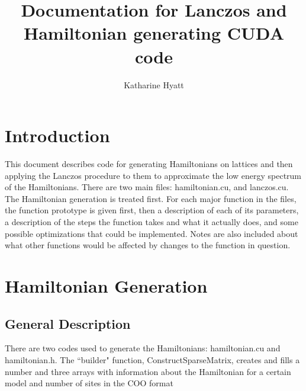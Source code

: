 \documentclass{article}
\author{Katharine Hyatt}
\title{Documentation for Lanczos and Hamiltonian generating CUDA code}
\begin{document}
\renewcommand{\int}{\textcolor{Green}{int $\,$}}
\newcommand{\const}{\textcolor{Green}{const $\,$}}
\renewcommand{\long}{\textcolor{Green}{long $\,$}}
\newcommand{\double}{\textcolor{Green}{double $\,$}}
\newcommand{\typelongptr}{\textcolor{Green}{long$^\ast \,$}}
\newcommand{\void}{\textcolor{Green}{void $\,$}}
\newcommand{\typelongtwoptr}{\textcolor{Green}{long2$^\ast \,$}}
\newcommand{\cuDoubleComplex}{\textcolor{Green}{cuDoubleComplex$^\ast \,$}}
\newcommand{\hamstruct}{\textcolor{Green}{hamstruct$^\ast \,$}}
\newcommand{\host}{\textcolor{Red}{$\_\_$host$\_\_ \; \;$}}
\newcommand{\cudaglobal}{\textcolor{Red}{$\_\_$global$\_\_ \; \;$}}
\newcommand{\device}{\textcolor{Red}{$\_\_$device$\_\_ \; \;$}}

\begin{titlepage}
\maketitle
\end{titlepage}

\section{Introduction}

This document describes code for generating Hamiltonians on lattices and then applying the Lanczos procedure to them to approximate the low energy spectrum of the Hamiltonians. There are two main files: hamiltonian.cu, and lanczos.cu. The Hamiltonian generation is treated first. For each major function in the files, the function prototype is given first, then a description of each of its parameters, a description of the steps the function takes and what it actually does, and some possible optimizations that could be implemented. Notes are also included about what other functions would be affected by changes to the function in question.

\section{Hamiltonian Generation}

\subsection{General Description}

There are two codes used to generate the Hamiltonians: hamiltonian.cu and hamiltonian.h. The ``builder" function, ConstructSparseMatrix, creates and fills a number and three arrays with information about the Hamiltonian for a certain model and number of sites in the COO format
\end{document}
